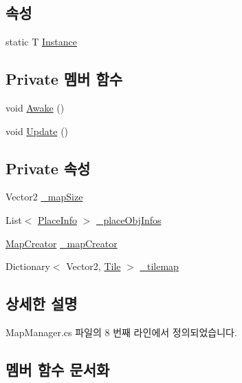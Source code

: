 \subsection*{속성}
\begin{DoxyCompactItemize}
\item 
static T \hyperlink{class_f_z_1_1_mono_singletone_a39e34129d25a9664576949259e7dfd5f}{Instance}
\end{DoxyCompactItemize}
\subsection*{Private 멤버 함수}
\begin{DoxyCompactItemize}
\item 
void \hyperlink{class_map_manager_ad633984007048c7d63eab44aaeb0c32d}{Awake} ()
\item 
void \hyperlink{class_map_manager_aeaf61c0a498d98a5ac778db479353d77}{Update} ()
\end{DoxyCompactItemize}
\subsection*{Private 속성}
\begin{DoxyCompactItemize}
\item 
Vector2 \hyperlink{class_map_manager_a960f398cc92f569f620ddc8c0140a5c7}{\+\_\+map\+Size}
\item 
List$<$ \hyperlink{class_f_z_1_1_place_info}{Place\+Info} $>$ \hyperlink{class_map_manager_ab581d2c754246f74999a0b744ba2b14f}{\+\_\+place\+Obj\+Infos}
\item 
\hyperlink{class_map_creator}{Map\+Creator} \hyperlink{class_map_manager_aa837a852f355a33b263c1bb07c6c4ece}{\+\_\+map\+Creator}
\item 
Dictionary$<$ Vector2, \hyperlink{class_tile}{Tile} $>$ \hyperlink{class_map_manager_a58f7635d8e19795f3845a3f85e2b4ac3}{\+\_\+tilemap}
\end{DoxyCompactItemize}


\subsection{상세한 설명}


Map\+Manager.\+cs 파일의 8 번째 라인에서 정의되었습니다.



\subsection{멤버 함수 문서화}
